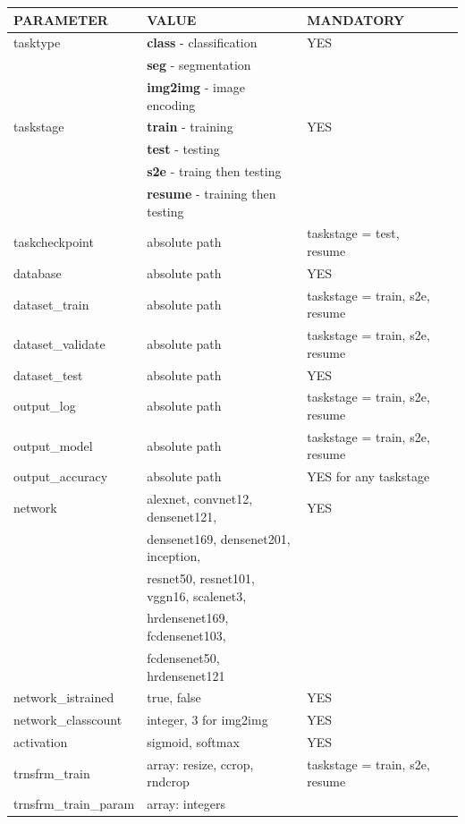 \documentclass[a4paper, 11pt]{article}
\begin{document}
\begin{center}
\begin{table}
\label{tabjson}
\begin{tabular}{|l|l|l|l|}
\hline
PARAMETER & VALUE & MANDATORY  \\
\hline
tasktype & \textbf{class} - classification & YES \\
		 & \textbf{seg} - segmentation &  \\
		 & \textbf{img2img} - image encoding & \\
\hline
taskstage & \textbf{train} - training & YES \\
		  & \textbf{test} - testing & \\
		  & \textbf{s2e} - traing then testing & \\
		  & \textbf{resume} - training then testing & \\
\hline
taskcheckpoint & absolute path & taskstage = test, resume \\ 
\hline
database & absolute path & YES \\
\hline
dataset\_train & absolute path & taskstage = train, s2e, resume \\
\hline
dataset\_validate & absolute path &  taskstage = train, s2e, resume\\
\hline
dataset\_test & absolute path &  YES  \\
\hline
output\_log & absolute path & taskstage = train, s2e, resume  \\
\hline
output\_model & absolute path & taskstage = train, s2e, resume \\
\hline
output\_accuracy & absolute path & YES for any taskstage \\
\hline
network & alexnet, convnet12, densenet121,& YES \\
&  densenet169, densenet201, inception,  & \\
& resnet50, resnet101, vggn16, scalenet3,  &\\
& hrdensenet169,  fcdensenet103,  &\\
& fcdensenet50, hrdensenet121 & \\
\hline 
network\_istrained & true, false & YES \\
\hline 
network\_classcount & integer, 3 for img2img  & YES \\
\hline 
activation & sigmoid, softmax & YES \\
\hline 
trnsfrm\_train & array: resize, ccrop, rndcrop & taskstage = train, s2e, resume \\
trnsfrm\_train\_param & array: integers & \\

\end{tabular}
\end{table}
\end{center}
\end{document}
